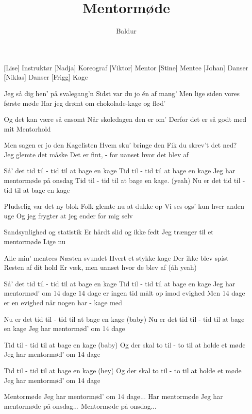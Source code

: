 \documentclass[a4paper,11pt]{article}
\title{Mentormøde}
\author{Baldur}
\begin{document}
\maketitle

\begin{roles}
[Lise] Instruktør
[Nadja] Koreograf
[Viktor] Mentor
[Stine] Mentee
[Johan] Danser
[Niklas] Danser
[Frigg] Kage
\end{roles}



\begin{song}
 Jeg så dig hen' på svalegang'n
Sidst var du jo én af mang'
Men lige siden vores første møde
Har jeg drømt om chokolade-kage og flød'

 Og det kan være så ensomt
Når skoledagen den er om'
Derfor det er så godt med mit
Mentorhold

 Men sagen er jo den
 Kagelisten
 Hvem sku' bringe den
 Fik du skrev't det ned?
 Jeg glemte det måske
 Det er fint,
 - for uanset hvor det blev af

 Så' det tid til - tid til at bage en kage
Tid til - tid til at bage en kage
Jeg har mentormøde på onsdag
Tid til - tid til at bage en kage. (yeah)
Nu er det tid til - tid til at bage en kage

 Pludselig var det ny blok
Folk glemte nu at dukke op
Vi ses ogs' kun hver anden uge
Og jeg frygter at jeg ender for mig selv

 Sandsynlighed og statistik
Er hårdt slid og ikke fedt
Jeg trænger til et mentormøde
Lige nu

 Alle min' mentees
 Næsten svundet
 Hvert et stykke kage
 Der ikke blev spist
 Resten af dit hold
 Er væk,
 men uanset hvor de blev af (åh yeah)

 Så' det tid til - tid til at bage en kage
Tid til - tid til at bage en kage
Jeg har mentormød' om 14 dage
14 dage er ingen tid målt op imod evighed
Men 14 dage er en evighed når nogen har - kage med

 Nu er det tid til - tid til at bage en kage (baby)
 Nu er det tid til - tid til at bage en kage
Jeg har mentormød' om 14 dage

Tid til - tid til at bage en kage (baby)
Og der skal to til - to til at holde et møde
Jeg har mentormød' om 14 dage

Tid til - tid til at bage en kage (hey)
Og der skal to til - to til at holde et møde
Jeg har mentormød' om 14 dage

 Mentormøde
 Jeg har mentormød' om 14 dage...
 Har mentormøde
 Jeg har mentormøde på onsdag...
 Mentormøde på onsdag...
\end{song}
\end{document}
